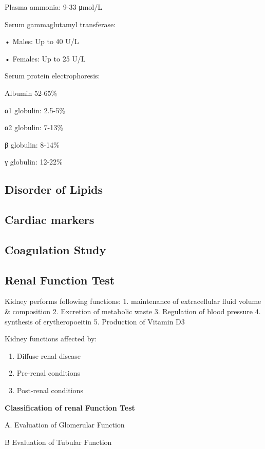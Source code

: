 \documentclass[
  letterpaper,
  DIV=11,
  numbers=noendperiod]{scrreprt}
\providecommand{\tightlist}{%
  \setlength{\itemsep}{0pt}\setlength{\parskip}{0pt}}\usepackage{longtable,booktabs,array}
\begin{document}
Plasma ammonia: 9-33 μmol/L

Serum gammaglutamyl transferase:

• Males: Up to 40 U/L

• Females: Up to 25 U/L

Serum protein electrophoresis:

Albumin 52-65\%

α1 globulin: 2.5-5\%

α2 globulin: 7-13\%

β globulin: 8-14\%

γ globulin: 12-22\%

\subsection{Disorder of Lipids}\label{disorder-of-lipids}

\subsection{Cardiac markers}\label{cardiac-markers}

\subsection{Coagulation Study}\label{coagulation-study}

\subsection{Renal Function Test}\label{renal-function-test}

Kidney performs following functions: 1. maintenance of extracellular
fluid volume \& composition 2. Excretion of metabolic waste 3.
Regulation of blood pressure 4. synthesis of erytheropoeitin 5.
Production of Vitamin D3

Kidney functions affected by:

\begin{enumerate}
\def\labelenumi{\arabic{enumi}.}
\tightlist
\item
  Diffuse renal disease
\item
  Pre-renal conditions
\item
  Post-renal conditions
\end{enumerate}

\textbf{Classification of renal Function Test}

A. Evaluation of Glomerular Function

B Evaluation of Tubular Function
\end{document}
